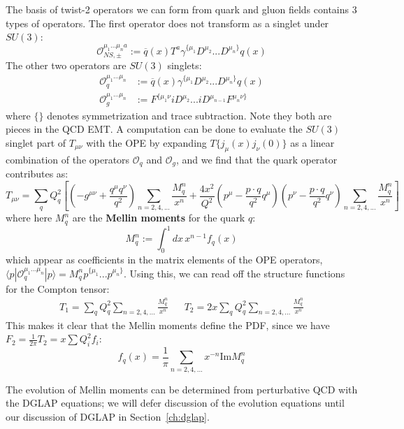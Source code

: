 \documentclass[11pt, oneside]{article}   	%
\theoremstyle{definition}
\begin{document}
The basis of twist-2 operators we can form from quark and gluon fields contains 3 types of operators. The first operator does 
not transform as a singlet under $SU(3)$:
\begin{equation}
	\mathcal{O}_{NS, \pm}^{\mu_1 ... \mu_n a} := \overline q(x) T^a \gamma^{\{\mu_1}D^{\mu_2} ... D^{\mu_n\}} q(x)
\end{equation}
The other two operators are $SU(3)$ singlets:
\begin{align}
	\mathcal{O}_{q}^{\mu_1 ... \mu_n} &:= \overline q(x) \gamma^{\{\mu_1} D^{\mu_2} ... D^{\mu_n\}}q(x) \\
	\mathcal{O}_{g}^{\mu_1 ... \mu_n} &:= F^{\{\mu_1\nu} i D^{\mu_2} ... i D^{\mu_{n - 1}} F^{\mu_n\nu\}}
\end{align}
where $\{\}$ denotes symmetrization and trace subtraction. Note they both are pieces in the QCD EMT. A computation can be 
done to evaluate the $SU(3)$ singlet part of $T_{\mu\nu}$ with the OPE by expanding $T\{j_\mu(x) j_\nu(0)\}$ as a linear combination of the 
operators $\mathcal{O}_q$ and $\mathcal{O}_g$, and we find that the quark operator contributes as:
\begin{equation}
	T_{\mu\nu} = \sum_q Q_q^2\left[\left(-g^{\mu\nu} + \frac{q^\mu q^\nu}{q^2}\right)\sum_{n = 2, 4, ...} 
	\frac{M_q^n}{x^n} + \frac{4 x^2}{Q^2}\left(p^\mu - \frac{p\cdot q}{q^2}q^\mu\right)\left(p^\nu - 
	\frac{p\cdot q}{q^2}q^\nu\right)\sum_{n = 2, 4, ...} \frac{M_q^n}{x^n}\right]
\end{equation}
where here $M_q^n$ are the \textbf{Mellin moments} for the quark $q$:
\begin{equation}
	M_q^n := \int_0^1 dx\, x^{n - 1} f_q(x)
\end{equation}
which appear as coefficients in the matrix elements of the OPE operators, $\langle p | \mathcal{O}_q^{\mu_1 ... \mu_n} 
| p\rangle = M_q^n p^{\{\mu_1} ... p^{\mu_n\}}$. Using this, we can read off the structure functions for the Compton 
tensor:
\begin{align}
	T_1 = \sum_q Q_q^2\sum_{n = 2, 4, ...}\frac{M_q^n}{x^n} && T_2 = 2x\sum_q Q_q^2\sum_{n = 2, 4, ...}
	\frac{M_q^n}{x^n}
\end{align}
This makes it clear that the Mellin moments define the PDF, since we have $F_2 = \frac{1}{2\pi} T_2 = x \sum Q_i^2 f_i$:
\begin{equation}
	f_q(x) = \frac{1}{\pi} \sum_{n = 2, 4, ...} x^{-n} \mathrm{Im}M_q^n
\end{equation}

The evolution of Mellin moments can be determined from perturbative QCD with the DGLAP equations; we will defer discussion of 
the evolution equations until our discussion of DGLAP in Section~\ref{ch:dglap}.
\end{document}
